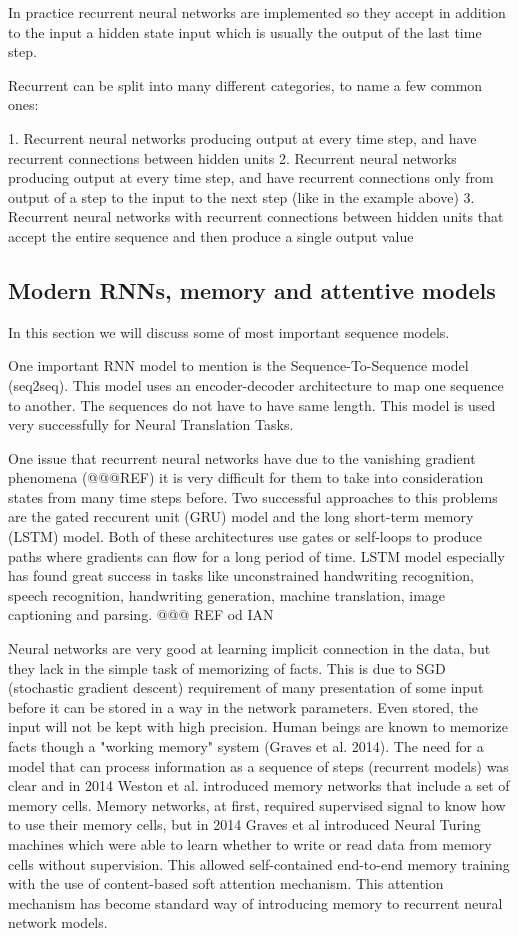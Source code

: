 \documentclass[b5paper]{book}
\begin{document}
In practice recurrent neural networks are implemented so they accept in addition to the input a hidden state input which is usually the output of the last time step.

Recurrent can be split into many different categories, to name a few common ones:

1. Recurrent neural networks producing output at every time step, and have recurrent connections between hidden units
2. Recurrent neural networks producing output at every time step, and have recurrent connections only from output of a step to the input to the next step (like in the example above)
3. Recurrent neural networks with recurrent connections between hidden units that accept the entire sequence and then produce a single output value

\subsection{Modern RNNs, memory and attentive models}

In this section we will discuss some of most important sequence models.

One important RNN model to mention is the Sequence-To-Sequence model (seq2seq). This model uses an encoder-decoder architecture to map one sequence to another. The sequences do not have to have same length. This model is used very successfully for Neural Translation Tasks.

One issue that recurrent neural networks have due to the vanishing gradient phenomena (@@@REF) it is very difficult for them to take into consideration states from many time steps before. Two successful approaches to this problems are the gated reccurent unit (GRU) model and the long short-term memory (LSTM) model. Both of these architectures use gates or self-loops to produce paths where gradients can flow for a long period of time. LSTM model especially has found great success in tasks like unconstrained handwriting recognition, speech recognition, handwriting generation, machine translation, image captioning and parsing. @@@ REF od IAN

Neural networks are very good at learning implicit connection in the data, but they lack in the simple task of memorizing of facts. This is due to SGD (stochastic gradient descent) requirement of many presentation of some input before it can be stored in a way in the network parameters. Even stored, the input will not be kept with high precision. Human beings are known to memorize facts though a "working memory" system (Graves et al. 2014). The need for a model that can process information as a sequence of steps (recurrent models) was clear and in 2014 Weston et al. introduced memory networks that include a set of memory cells. Memory networks, at first, required supervised signal to know how to use their memory cells, but in 2014 Graves et al introduced Neural Turing machines which were able to learn whether to write or read data from memory cells without supervision. This allowed self-contained end-to-end memory training with the use of content-based soft attention mechanism. This attention mechanism has become standard way of introducing memory to recurrent neural network models.
\end{document}

